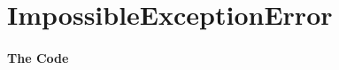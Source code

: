 \section{ImpossibleExceptionError}\label{code:ImpossibleExceptionError}

\autocite{TQUADRAT_ORG_FOUNDATION_IMPOSSIBLEEXCEPTIONERROR}


\paragraph{The Code}\


